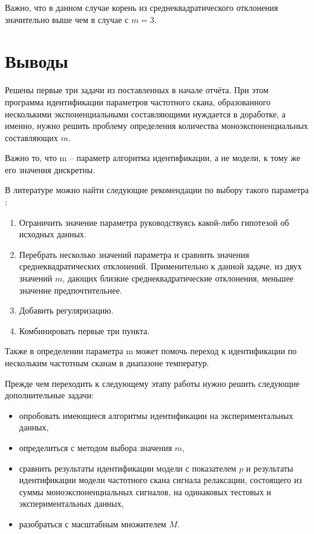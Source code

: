 \documentclass{report}
\begin{document}
        Важно, что в данном случае корень из среднеквадратического отклонения 
        значительно выше чем в случае с $m=3$.


        \chapter{Выводы}
        Решены первые три задачи из поставленных в начале отчёта. При этом программа 
        идентификации параметров частотного скана, образованного несколькими 
        экспоненциальными составляющими нуждается в доработке, а именно, нужно 
        решить проблему определения количества моноэкспоненциальных составляющих $m$. 

        Важно то, что m -- параметр алгоритма идентификации, а не модели, к тому же 
        его значения дискретны.

        В литературе можно найти следующие рекомендации по выбору такого параметра
        \cite{hands_on_ml}:
        \begin{enumerate}
            \item Ограничить значение параметра руководствуясь какой-либо гипотезой 
            об исходных данных.
            \item Перебрать несколько значений параметра и сравнить значения 
            среднеквадратических отклонений. Применительно к данной задаче, из двух 
            значений $m$, дающих близкие среднеквадратические отклонения, меньшее 
            значение предпочтительнее.
            \item Добавить регуляризацию.
            \item Комбинировать первые три пункта.
        \end{enumerate}

        Также в определении параметра m может помочь переход к идентификации 
        по нескольким частотным сканам в диапазоне температур.

        Прежде чем переходить к следующему этапу работы нужно решить следующие 
        дополнительные задачи:
        \begin{itemize}
            \item опробовать имеющиеся алгоритмы идентификации на 
            экспериментальных данных,
            \item определиться с методом выбора значения $m$,
            \item сравнить результаты идентификации модели с показателем $p$
            и результаты идентификации модели частотного скана сигнала релаксации, 
            состоящего из суммы моноэкспоненциальных сигналов, на одинаковых 
            тестовых и экспериментальных данных,
            \item разобраться с масштабным множителем $M$. 
        \end{itemize}









    
    \printbibliography
\end{document}
